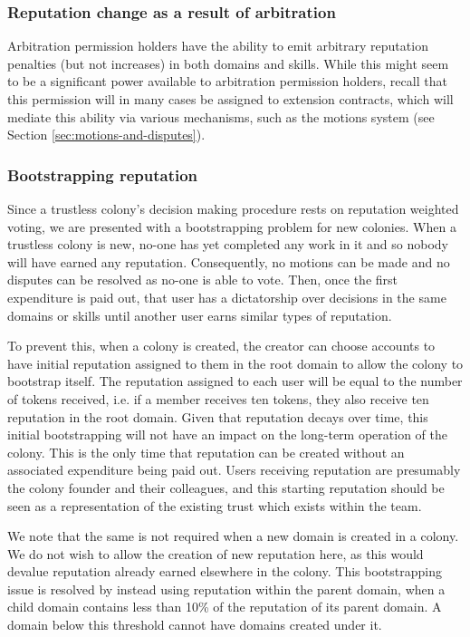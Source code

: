 \subsubsection*{Reputation change as a result of arbitration}\label{sec:earning-rep-in-disputes}

Arbitration permission holders have the ability to emit arbitrary reputation penalties (but not increases) in both domains and skills. While this might seem to be a significant power available to arbitration permission holders, recall that this permission will in many cases be assigned to extension contracts, which will mediate this ability via various mechanisms, such as the motions system (see Section \ref{sec:motions-and-disputes}).

\subsubsection*{Bootstrapping reputation}\label{sec:bootstrapping-rep}

Since a trustless colony's decision making procedure rests on reputation weighted voting, we are presented with a bootstrapping problem for new colonies. When a trustless colony is new, no-one has yet completed any work in it and so nobody will have earned any reputation. Consequently, no motions can be made and no disputes can be resolved as no-one is able to vote. Then, once the first expenditure is paid out, that user has a dictatorship over decisions in the same domains or skills until another user earns similar types of reputation.

To prevent this, when a colony is created, the creator can choose accounts to have initial reputation assigned to them in the root domain to allow the colony to bootstrap itself. The reputation assigned to each user will be equal to the number of tokens received, i.e. if a member receives ten tokens, they also receive ten reputation in the root domain. Given that reputation decays over time, this initial bootstrapping will not have an impact on the long-term operation of the colony. This is the only time that reputation can be created without an associated expenditure being paid out. Users receiving reputation are presumably the colony founder and their colleagues, and this starting reputation should be seen as a representation of the existing trust which exists within the team.

We note that the same is not required when a new domain is created in a colony. We do not wish to allow the creation of new reputation here, as this would devalue reputation already earned elsewhere in the colony. This bootstrapping issue is resolved by instead using reputation within the parent domain, when a child domain contains less than 10\% of the reputation of its parent domain. A domain below this threshold cannot have domains created under it.

